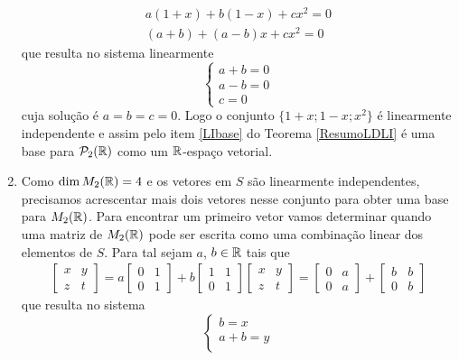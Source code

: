 \begin{exemplos}
\begin{solucao}
\begin{enumerate}
        \begin{align*}
          a(1 + x) + b(1 - x) + cx^2 = 0\\
          (a + b) + (a - b)x + cx^2 = 0
        \end{align*}
        que resulta no sistema linearmente
        \[
          \begin{cases}
            a + b = 0\\
            a - b = 0\\
            c = 0
          \end{cases}
        \]
        cuja solução é $a = b = c = 0$. Logo o conjunto $\{1 + x; 1 - x; x^2\}$ é linearmente independente e assim pelo item \ref{LIbase} do Teorema \ref{ResumoLDLI} é uma base para $\mathcal{P}_2(\mathbb{R})$ como um $\mathbb{R}$-espaço vetorial.

      \item Como $\dim M_2(\mathbb{R}) = 4$ e os vetores em $S$ são linearmente independentes, precisamos acrescentar mais dois vetores nesse conjunto para obter uma base para $M_2(\mathbb{R})$. Para encontrar um primeiro vetor vamos determinar quando uma matriz de $M_2(\mathbb{R})$ pode ser escrita como uma combinação linear dos elementos de $S$. Para tal sejam $a$, $b \in \mathbb{R}$ tais que
        \begin{align*}
          \begin{bmatrix}x & y\\z & t\end{bmatrix} = a\begin{bmatrix} 0 & 1\\0 & 1\end{bmatrix} + b\begin{bmatrix} 1 & 1\\0 & 1\end{bmatrix}
          \begin{bmatrix}x & y\\z & t\end{bmatrix} = \begin{bmatrix} 0 & a\\0 & a\end{bmatrix} + \begin{bmatrix} b & b\\0 & b\end{bmatrix}
        \end{align*}
        que resulta no sistema
        \[
          \begin{cases}
            b = x\\
            a + b = y\\

\end{cases}\]
\end{enumerate}
\end{solucao}
\end{exemplos}
